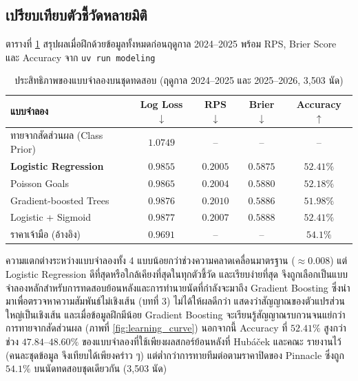 \subsection{เปรียบเทียบตัวชี้วัดหลายมิติ}

ตารางที่ \ref{tab:model_comparison} สรุปผลเมื่อฝึกด้วยข้อมูลทั้งหมดก่อนฤดูกาล 2024--2025 พร้อม RPS, Brier Score และ Accuracy จาก \texttt{uv run modeling}

\begin{table}[htbp]
\centering
\caption{ประสิทธิภาพของแบบจำลองบนชุดทดสอบ (ฤดูกาล 2024--2025 และ 2025--2026, 3,503 นัด)}
\label{tab:model_comparison}
\small
\begin{tabular}{|l|c|c|c|c|}
\hline
\textbf{แบบจำลอง} & \textbf{Log Loss} $\downarrow$ & \textbf{RPS} $\downarrow$ & \textbf{Brier} $\downarrow$ & \textbf{Accuracy} $\uparrow$ \\
\hline
ทายจากสัดส่วนผล (Class Prior) & $1.0749$ & -- & -- & -- \\
\textbf{Logistic Regression} & $\mathbf{0.9855}$ & $0.2005$ & $\mathbf{0.5875}$ & $\mathbf{52.41\%}$ \\
Poisson Goals & $0.9865$ & $\mathbf{0.2004}$ & $0.5880$ & $52.18\%$ \\
Gradient-boosted Trees & $0.9876$ & $0.2010$ & $0.5886$ & $51.98\%$ \\
Logistic + Sigmoid & $0.9877$ & $0.2007$ & $0.5888$ & $52.41\%$ \\
\hline
ราคาเจ้ามือ (อ้างอิง) & $0.9691$ & -- & -- & $54.1\%$ \\
\hline
\end{tabular}
\end{table}

ความแตกต่างระหว่างแบบจำลองทั้ง 4 แบบน้อยกว่าช่วงความคลาดเคลื่อนมาตรฐาน ($\approx 0.008$) แต่ Logistic Regression ดีที่สุดหรือใกล้เคียงที่สุดในทุกตัวชี้วัด และเรียบง่ายที่สุด จึงถูกเลือกเป็นแบบจำลองหลักสำหรับการทดสอบย้อนหลังและการทำนายนัดที่กำลังจะมาถึง Gradient Boosting ซึ่งนำมาเพื่อตรวจหาความสัมพันธ์ไม่เชิงเส้น (บทที่ 3) ไม่ได้ให้ผลดีกว่า แสดงว่าสัญญาณของตัวแปรส่วนใหญ่เป็นเชิงเส้น และเมื่อข้อมูลฝึกมีน้อย Gradient Boosting จะเรียนรู้สัญญาณรบกวนจนแย่กว่าการทายจากสัดส่วนผล (ภาพที่ \ref{fig:learning_curve}) นอกจากนี้ Accuracy ที่ $52.41\%$ สูงกว่าช่วง $47.84$--$48.60\%$ ของแบบจำลองที่ใช้เพียงผลสกอร์ย้อนหลังที่ Hubáček และคณะ \cite{hubacek2021forty} รายงานไว้ (คนละชุดข้อมูล จึงเทียบได้เพียงคร่าว ๆ) แต่ต่ำกว่าการทายทีมต่อตามราคาปิดของ Pinnacle ซึ่งถูก $54.1\%$ บนนัดทดสอบชุดเดียวกัน (3,503 นัด)

